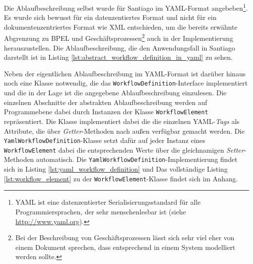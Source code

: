 

  Die Ablaufbeschreibung selbst wurde für Santiago im YAML-Format angebeben\footnote{YAML ist eine datenzentierter Serialisierungsstandard für alle Programmiersprachen, der sehr menschenlesbar ist (siehe \url{http://www.yaml.org}).}. Es wurde sich bewusst für ein datenzentiertes Format und nicht für ein dokumentenzentriertes Format wie XML entschieden, um die bereits erwähnte Abgrenzung zu BPEL und Geschäftsprozessen\footnote{Bei der Beschreibung von Geschäftsprozessen lässt sich sehr viel eher von einem Dokument sprechen, dass entsprechend in einem System modelliert werden sollte.} auch in der Implementierung herauszustellen. Die Ablaufbeschreibung, die den Anwendungsfall in Santiago darstellt ist in Listing \ref{lst:abstract_workflow_definition_in_yaml} zu sehen.



  Neben der eigentlichen Ablaufbeschreibung im YAML-Format ist darüber hinaus noch eine Klasse notwendig, die das \verb!WorkflowDefinition!-Interface implementiert und die in der Lage ist die angegebene Ablaufbeschreibung einzulesen. Die einzelnen Abschnitte der abstrakten Ablaufbeschreibung werden auf Programmebene dabei durch Instanzen der Klasse \verb!WorkflowElement! repräsentiert. Die Klasse implementiert dabei die die einzelnen YAML-\emph{Tags} als Attribute, die über \emph{Getter}-Methoden nach außen verfügbar gemacht werden. Die \verb!YamlWorkflowDefinition!-Klasse setzt dafür auf jeder Instanz eines \verb!WorkflowElement! dabei die entsprechenden Werte über die gleichnamigen \emph{Setter}-Methoden automatisch. Die \verb!YamlWorkflowDefinition!-Implementierung findet sich in Listing \ref{lst:yaml_workflow_definition} und Das vollständige Listing \ref{lst:workflow_element} zu der \verb!WorkflowElement!-Klasse findet sich im Anhang.


  
